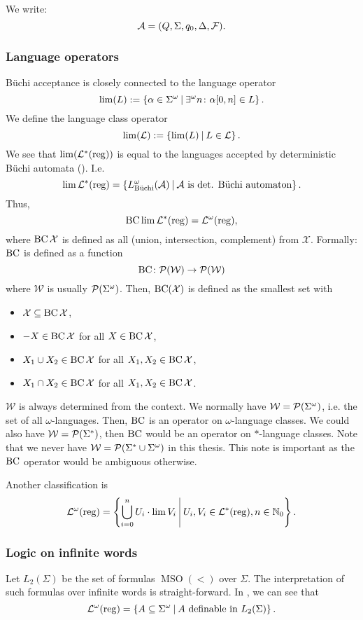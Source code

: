 We write:
\[ \mathcal{A} = (Q, \Sigma, q_0, \Delta, \mathcal{F}) . \]

\subsubsection{Language operators}
\label{reg:omega:vialangop}

Büchi acceptance is closely connected to the language operator
\[ \lim(L) := \Set{ \alpha \in \Sigma^\omega }{ \existsinf n \colon \alpha[0,n] \in L } . \]
We define the language class operator
\[ \lim(\Lang) := \Set{\lim(L)}{L \in \Lang} . \]
We see that $\lim(\mathcal{L}^*(\textup{\textrm{reg}}))$ is equal to the languages accepted by deterministic Büchi automata (\cite{InfCompR101}). %
I.e.
\[ \lim \Langreg = \Set{L^\omega_\text{Büchi}(\A)}{\text{$\A$ is det. Büchi automaton}} . \]
Thus,
\[  \operatorname{BC} \lim \mathcal{L}^*(\textup{\textrm{reg}}) = \mathcal{L}^\omega(\textup{\textrm{reg}}) , \]
where $\operatorname{BC} \mathcal{X}$ is defined as all  (union, intersection, complement) from $\mathcal{X}$. Formally: $\operatorname{BC}$ is defined as a function
\[ \operatorname{BC} \colon \mathcal{P}(\mathcal{W}) \rightarrow \mathcal{P}(\mathcal{W}) \]
where $\mathcal{W}$ is usually $\mathcal{P}(\Sigma^\omega)$. Then, $\operatorname{BC}(\mathcal{X})$ is defined as the smallest set with
\begin{itemize}
\item $\mathcal{X} \subseteq \operatorname{BC} \mathcal{X}$,
\item $-X \in \operatorname{BC} \mathcal{X}$ for all $X \in \operatorname{BC} \mathcal{X}$,
\item $X_1 \cup X_2 \in \operatorname{BC} \mathcal{X}$ for all $X_1,X_2 \in \operatorname{BC} \mathcal{X}$,
\item $X_1 \cap X_2 \in \operatorname{BC} \mathcal{X}$ for all $X_1,X_2 \in \operatorname{BC} \mathcal{X}$.
\end{itemize}
$\mathcal{W}$ is always determined from the context. We normally have $\mathcal{W} = \mathcal{P}(\Sigma^\omega)$, i.e. the set of all $\omega$-languages. Then, $\operatorname{BC}$ is an operator on $\omega$-language classes. We could also have $\mathcal{W} = \mathcal{P}(\Sigma^*)$, then $\operatorname{BC}$ would be an operator on $*$-language classes. Note that we never have $\mathcal{W} = \mathcal{P}(\Sigma^* \cup \Sigma^\omega)$ in this thesis. This note is important as the $\operatorname{BC}$ operator would be ambiguous otherwise.

Another classification is
\[ \LangOreg = \Set{ \bigcup_{i=0}^n U_i \cdot \lim V_i }{ U_i, V_i \in \Langreg, n \in \N_0 } . \]

\subsubsection{Logic on infinite words}
Let $L_2(\Sigma)$ be the set of formulas $\operatorname{MSO}(<)$ over $\Sigma$. The interpretation of such formulas over infinite words is straight-forward. In \cite[Theorem 3.1]{CombR107}, we can see that
\[ \LangOreg = \Set{A \subseteq \Sigma^\omega}{A \text{ definable in } L_2(\Sigma)} . \]

